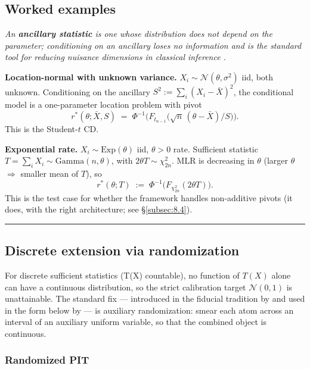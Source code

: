 \documentclass[11pt]{article}
\begin{document}
\subsection{Worked examples}\label{subsec:5.3}

\emph{An \textbf{ancillary statistic} is one whose distribution does not
depend on the parameter; conditioning on an ancillary loses no
information and is the standard tool for reducing nuisance dimensions in
classical inference \citep{Cox1958}.}

\textbf{Location-normal with unknown variance.}
\(X_i \sim \mathcal{N}(\theta, \sigma^2)\) iid, both unknown.
Conditioning on the ancillary \(S^2 := \sum_i (X_i - \bar X)^2\), the
conditional model is a one-parameter location problem with pivot \[
r^*(\theta; \bar X, S) \;=\; \Phi^{-1}\bigl( F_{t_{n-1}}\bigl(\sqrt{n}\,(\theta - \bar X)/S\bigr) \bigr).
\] This is the Student-\(t\) CD.

\textbf{Exponential rate.} \(X_i \sim \mathrm{Exp}(\theta)\) iid,
\(\theta > 0\) rate. Sufficient statistic
\(T = \sum_i X_i \sim \mathrm{Gamma}(n, \theta)\), with
\(2\theta T \sim \chi^2_{2n}\). MLR is decreasing in \(\theta\) (larger
\(\theta\) $\Rightarrow$ smaller mean of \(T\)), so \[
r^*(\theta; T) \;:=\; \Phi^{-1}\bigl( F_{\chi^2_{2n}}(2\theta T)\bigr).
\] This is the test case for whether the framework handles non-additive
pivots (it does, with the right architecture; see \S\ref{subsec:8.4}).

\medskip\hrule\medskip

\setcounter{subsection}{6}
\subsection{Discrete extension via randomization}\label{subsec:5.7}

For discrete sufficient statistics (T(X) countable), no function of
\(T(X)\) alone can have a continuous distribution, so the strict
calibration target \(\mathcal{N}(0,1)\) is unattainable. The standard
fix --- introduced in the fiducial tradition by
\citet{Stevens1950} and used in the form below by \citet{Lancaster1961}
--- is auxiliary randomization: smear each atom across
an interval of an auxiliary uniform variable, so that the combined
object is continuous.

\subsubsection{Randomized PIT}\label{subsubsec:5.7.1}
\end{document}
